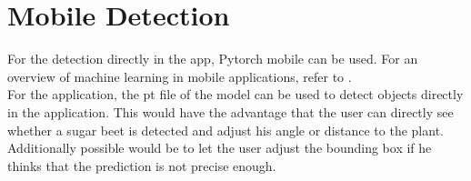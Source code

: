 \section{Mobile Detection}
For the detection directly in the app, Pytorch mobile \cite{pytorch_mobile} can be used. For an overview of machine learning in mobile applications, refer to \cite{survey_machine_learning_mobile}. \\

For the application, the pt file of the model can be used to detect objects directly in the application. This would have the advantage that the user can directly see whether a sugar beet is detected and adjust his angle or distance to the plant. Additionally possible would be to let the user adjust the bounding box if he thinks that the prediction is not precise enough. 


